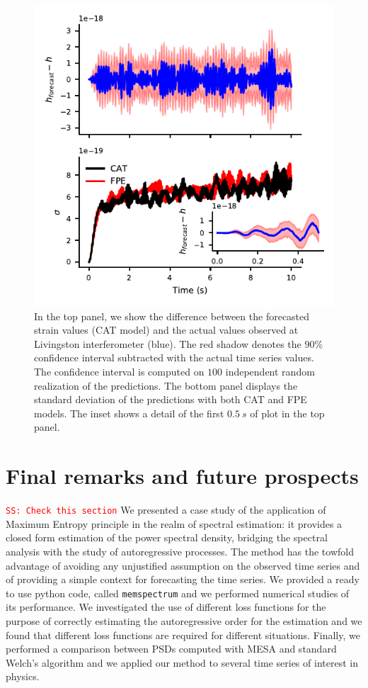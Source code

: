 \documentclass[twocolumn,showpacs,preprintnumbers,nofootinbib,prd,
superscriptaddress,10pt]{revtex4-1}
\newcommand{\sschmidt}[1]{{\textcolor{red}{\texttt{SS: #1}} }}
\begin{document}
\begin{figure}
	\caption{In the top panel, we show the difference between the forecasted strain values (CAT model) and the actual values observed at Livingston interferometer (blue). The red shadow denotes the $90\%$ confidence interval subtracted with the actual time series values. The confidence interval is computed on  $100$ independent random realization of the predictions.
	The bottom panel displays the standard deviation of the predictions with both CAT and FPE models. The inset shows a detail of the first $\SI{0.5}{s}$ of plot in the top panel.
	}
	\label{fig:LIGO_forecast}
	\includegraphics{Images/forecast_LIGO/forecast_accuracy.pdf}
\end{figure}


\section{Final remarks and future prospects} \label{sec:conclusion}
\sschmidt{Check this section}
We presented a case study of the application of Maximum Entropy principle in the realm of spectral estimation: it provides a closed form estimation of the power spectral density, bridging the spectral analysis with the study of autoregressive processes. The method has the towfold advantage of avoiding any unjustified assumption on the observed time series and of providing a simple context for forecasting the time series. We provided a ready to use python code, called \texttt{memspectrum} and we performed numerical studies of its performance.
We investigated the use of different loss functions for the purpose of correctly estimating the autoregressive order for the estimation and we found that different loss functions are required for different situations.
Finally, we performed a comparison between PSDs computed with MESA and standard Welch's algorithm and we applied our method to several time series of interest in physics.
\end{document}
